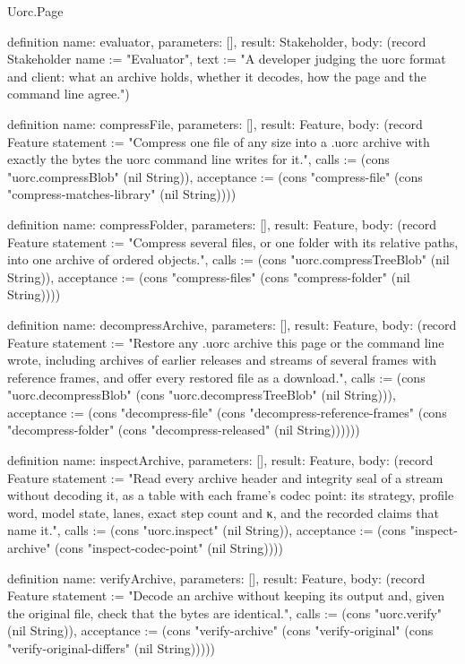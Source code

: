 \begin{lexlean}{Uorc.Page}
\begin{semanticmodule}
definition{
  name: evaluator,
  parameters: [],
  result: Stakeholder,
  body: (record Stakeholder {name := "Evaluator", text := "A developer judging the uorc format and client: what an archive holds, whether it decodes, how the page and the command line agree."})
}

definition{
  name: compressFile,
  parameters: [],
  result: Feature,
  body: (record Feature {statement := "Compress one file of any size into a .uorc archive with exactly the bytes the uorc command line writes for it.", calls := (cons "uorc.compressBlob" (nil String)), acceptance := (cons "compress-file" (cons "compress-matches-library" (nil String)))})
}

definition{
  name: compressFolder,
  parameters: [],
  result: Feature,
  body: (record Feature {statement := "Compress several files, or one folder with its relative paths, into one archive of ordered objects.", calls := (cons "uorc.compressTreeBlob" (nil String)), acceptance := (cons "compress-files" (cons "compress-folder" (nil String)))})
}

definition{
  name: decompressArchive,
  parameters: [],
  result: Feature,
  body: (record Feature {statement := "Restore any .uorc archive this page or the command line wrote, including archives of earlier releases and streams of several frames with reference frames, and offer every restored file as a download.", calls := (cons "uorc.decompressBlob" (cons "uorc.decompressTreeBlob" (nil String))), acceptance := (cons "decompress-file" (cons "decompress-reference-frames" (cons "decompress-folder" (cons "decompress-released" (nil String)))))})
}

definition{
  name: inspectArchive,
  parameters: [],
  result: Feature,
  body: (record Feature {statement := "Read every archive header and integrity seal of a stream without decoding it, as a table with each frame's codec point: its strategy, profile word, model state, lanes, exact step count and κ, and the recorded claims that name it.", calls := (cons "uorc.inspect" (nil String)), acceptance := (cons "inspect-archive" (cons "inspect-codec-point" (nil String)))})
}

definition{
  name: verifyArchive,
  parameters: [],
  result: Feature,
  body: (record Feature {statement := "Decode an archive without keeping its output and, given the original file, check that the bytes are identical.", calls := (cons "uorc.verify" (nil String)), acceptance := (cons "verify-archive" (cons "verify-original" (cons "verify-original-differs" (nil String))))})
}


\end{semanticmodule}
\end{lexlean}
